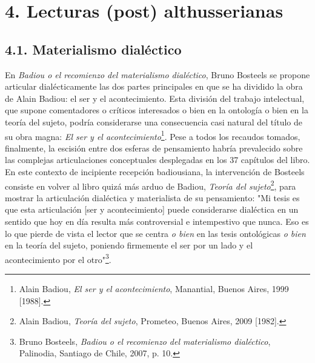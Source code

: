 \documentclass{book}
\begin{document}
\section{4. Lecturas (post) althusserianas}

\subsection{4.1. Materialismo dialéctico}

En \emph{Badiou o el recomienzo del materialismo dialéctico}, Bruno
Bosteels se propone articular dialécticamente las dos partes principales
en que se ha dividido la obra de Alain Badiou: el ser y el
acontecimiento. Esta división del trabajo intelectual, que supone
comentadores o críticos interesados o bien en la ontología o bien en la
teoría del sujeto, podría considerarse una consecuencia casi natural del
título de su obra magna: \emph{El ser y el acontecimiento}\footnote{Alain
  Badiou, \emph{El ser y el acontecimiento}, Manantial, Buenos Aires,
  1999 {[}1988{]}.}. Pese a todos los recaudos tomados, finalmente, la
escisión entre dos esferas de pensamiento habría prevalecido sobre las
complejas articulaciones conceptuales desplegadas en los 37 capítulos
del libro. En este contexto de incipiente recepción badiousiana, la
intervención de Bosteels consiste en volver al libro quizá más arduo de
Badiou, \emph{Teoría del sujeto}\footnote{Alain Badiou, \emph{Teoría del
  sujeto}, Prometeo, Buenos Aires, 2009 {[}1982{]}.}, para mostrar la
articulación dialéctica y materialista de su pensamiento: "Mi tesis es
que esta articulación {[}ser y acontecimiento{]} puede considerarse
dialéctica en un sentido que hoy en día resulta más controversial e
intempestivo que nunca. Eso es lo que pierde de vista el lector que se
centra \emph{o bien} en las tesis ontológicas \emph{o bien} en la teoría
del sujeto, poniendo firmemente el ser por un lado y el acontecimiento
por el otro"\footnote{Bruno Bosteels, \emph{Badiou o el recomienzo del
  materialismo dialéctico}, Palinodia, Santiago de Chile, 2007, p. 10.}.
\end{document}
